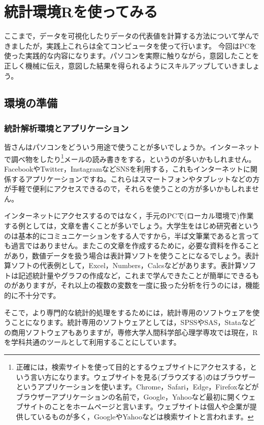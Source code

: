 \documentclass{ltjbook}
\begin{document}
 
\VerbatimFootnotes
\chapter{統計環境Rを使ってみる} 
\label{chapter5} 
ここまで，データを可視化したりデータの代表値を計算する方法について学んできましたが，実践上これらは全てコンピュータを使って行います。
今回はPCを使った実践的な内容になります。パソコンを実際に触りながら，意図したことを正しく機械に伝え，意図した結果を得られるようにスキルアップしていきましょう。

\section{環境の準備}
\subsection{統計解析環境とアプリケーション}
皆さんはパソコンをどういう用途で使うことが多いでしょうか。インターネットで調べ物をしたり\footnote{正確には，検索サイトを使って目的とするウェブサイトにアクセスする，という言い方になります。ウェブサイトを見る(ブラウズする)のはブラウザーというアプリケーションを使います。Chrome，Safari，Edge，Firefoxなどがブラウザーアプリケーションの名前で，Google，Yahooなど最初に開くウェブサイトのことをホームページと言います。ウェブサイトは個人や企業が提供しているものが多く，GoogleやYahooなどは検索サイトと言われます。}メールの読み書きをする，というのが多いかもしれません。FacebookやTwitter，InstagramなどSNSを利用する，これもインターネットに関係するアプリケーションですね。これらはスマートフォンやタブレットなどの方が手軽で便利にアクセスできるので，それらを使うことの方が多いかもしれません。

インターネットにアクセスするのではなく，手元のPCで(ローカル環境で)作業する例としては，文章を書くことが多いでしょう。大学生をはじめ研究者というのは基本的にコミュニケーションをする人ですから，半ば文筆業であると言っても過言ではありません。またこの文章を作成するために，必要な資料を作ることがあり，数値データを扱う場合は表計算ソフトを使うことになるでしょう。表計算ソフトの代表例として，Excel，Numbers，Calcsなどがあります。表計算ソフトは記述統計量やグラフの作成など，これまで学んできたことが簡単にできるものがありますが，それ以上の複数の変数を一度に扱った分析を行うのには，機能的に不十分です。

そこで，より専門的な統計的処理をするためには，統計専用のソフトウェアを使うことになります。統計専用のソフトウェアとしては，SPSSやSAS，Stataなどの商用ソフトウェアもありますが，専修大学人間科学部心理学専攻では現在，Rを学科共通のツールとして利用することにしています。
\end{document}
